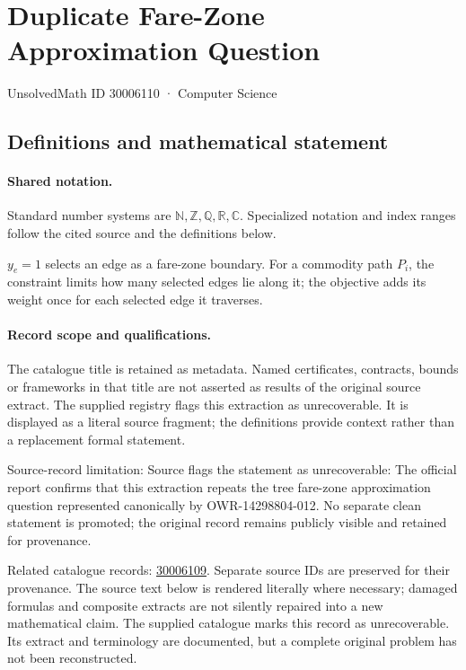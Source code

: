 \documentclass[11pt]{article}
\begin{document}
\setcounter{section}{30006109}
\section{Duplicate Fare-Zone Approximation Question}\label{30006110}
{\small\sffamily UnsolvedMath ID 30006110 · Computer Science}
\subsection{Definitions and mathematical statement}

\paragraph{Shared notation.}Standard number systems are $\mathbb N,\mathbb Z,\mathbb Q,\mathbb R,\mathbb C$. Specialized notation and index ranges follow the cited source and the definitions below.


$y_e=1$ selects an edge as a fare-zone boundary. For a commodity path $P_i$, the constraint limits how many selected edges lie along it; the objective adds its weight once for each selected edge it traverses.
\paragraph{Record scope and qualifications.}
The catalogue title is retained as metadata. Named certificates, contracts, bounds or frameworks in that title are not asserted as results of the original source extract.
The supplied registry flags this extraction as unrecoverable. It is displayed as a literal source fragment; the definitions provide context rather than a replacement formal statement.

Source-record limitation: Source flags the statement as unrecoverable: The official report confirms that this extraction repeats the tree fare-zone approximation question represented canonically by OWR-14298804-012. No separate clean statement is promoted; the original record remains publicly visible and retained for provenance.

Related catalogue records: \href{https://mehmetmars7.github.io/Erdosproblems-llm-hunter/problem.html?type=open_problems&id=30006109}{30006109}. Separate source IDs are preserved for their provenance.
The source text below is rendered literally where necessary; damaged formulas and composite extracts are not silently repaired into a new mathematical claim.
The supplied catalogue marks this record as unrecoverable. Its extract and terminology are documented, but a complete original problem has not been reconstructed.
\end{document}
